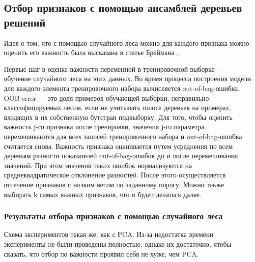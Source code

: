\subsection{Отбор признаков с помощью ансамблей деревьев решений}
Идея о том, что с помощью случайного леса можно для каждого признака можно оценить его важность была высказана в статье Бреймана \cite{breiman}.
\par
Первые шаг в оценке важности переменной в тренировочной выборке --- обучение случайного леса на этих данных. Во время процесса построения модели для каждого элемента тренировочного набора вычисляется out-of-bag-ошибка.
OOB error --- это доля примеров обучающей выборки, неправильно классифицируемых лесом, если не учитывать голоса деревьев на примерах, входящих в их собственную бутстрап подвыборку.
Для того, чтобы оценить важность j-го признака после тренировки, значения j-го параметра перемешиваются для всех записей тренировочного набора и out-of-bag-ошибка считается снова. Важность признака оценивается путем усреднения по всем деревьям разности показателей out-of-bag-ошибок до и после перемешивания значений. При этом значения таких ошибок нормализуются на среднеквадратическое отклонение разностей.
После этого осуществляется отсечение признаков с низким весом по заданному порогу. Можно также выбирать k самых важных признаков, что и будет делаться далее.
\subsubsection*{Результаты отбора признаков с помощью случайного леса}
Схема экспериментов такая же, как с PCA. Из-за недостатка времени эксперименты не были проведены полностью, однако их достаточно, чтобы сказать, что отбор по важности проявил себя не хуже, чем PCA.
